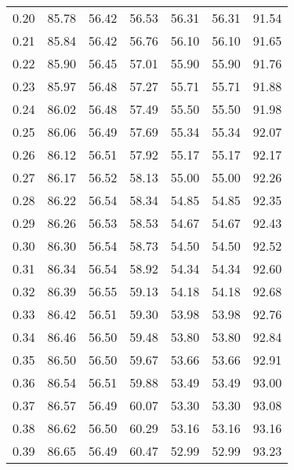 \begin{tabular}{|c|c|c|c|c|c|c|}
      0.20 &     85.78 &     56.42 &      56.53 &   56.31 &      56.31 &         91.54 \\
      0.21 &     85.84 &     56.42 &      56.76 &   56.10 &      56.10 &         91.65 \\
      0.22 &     85.90 &     56.45 &      57.01 &   55.90 &      55.90 &         91.76 \\
      0.23 &     85.97 &     56.48 &      57.27 &   55.71 &      55.71 &         91.88 \\
      0.24 &     86.02 &     56.48 &      57.49 &   55.50 &      55.50 &         91.98 \\
      0.25 &     86.06 &     56.49 &      57.69 &   55.34 &      55.34 &         92.07 \\
      0.26 &     86.12 &     56.51 &      57.92 &   55.17 &      55.17 &         92.17 \\
      0.27 &     86.17 &     56.52 &      58.13 &   55.00 &      55.00 &         92.26 \\
      0.28 &     86.22 &     56.54 &      58.34 &   54.85 &      54.85 &         92.35 \\
      0.29 &     86.26 &     56.53 &      58.53 &   54.67 &      54.67 &         92.43 \\
      0.30 &     86.30 &     56.54 &      58.73 &   54.50 &      54.50 &         92.52 \\
      0.31 &     86.34 &     56.54 &      58.92 &   54.34 &      54.34 &         92.60 \\
      0.32 &     86.39 &     56.55 &      59.13 &   54.18 &      54.18 &         92.68 \\
      0.33 &     86.42 &     56.51 &      59.30 &   53.98 &      53.98 &         92.76 \\
      0.34 &     86.46 &     56.50 &      59.48 &   53.80 &      53.80 &         92.84 \\
      0.35 &     86.50 &     56.50 &      59.67 &   53.66 &      53.66 &         92.91 \\
      0.36 &     86.54 &     56.51 &      59.88 &   53.49 &      53.49 &         93.00 \\
      0.37 &     86.57 &     56.49 &      60.07 &   53.30 &      53.30 &         93.08 \\
      0.38 &     86.62 &     56.50 &      60.29 &   53.16 &      53.16 &         93.16 \\
      0.39 &     86.65 &     56.49 &      60.47 &   52.99 &      52.99 &         93.23 \\

\end{tabular}
